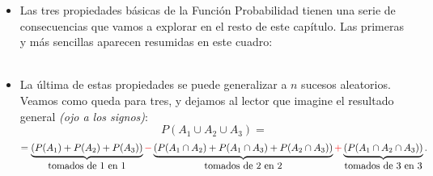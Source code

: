 \begin{itemize}

    \item Las tres propiedades básicas de la Función Probabilidad tienen una serie de consecuencias que vamos a explorar en el resto de este capítulo. Las primeras y más sencillas aparecen resumidas en este cuadro:\\[3mm]
                \\[3mm]
    \item La última de estas propiedades se puede generalizar a $n$ sucesos aleatorios. Veamos como queda para tres, y dejamos al lector que imagine el resultado general {\em (ojo a los signos)}:
    \[P(A_1\cup A_2\cup A_3)=\]\[=\underbrace{\left(P(A_1)+P(A_2)+P(A_3)\right)}_{\mbox{tomados de 1 en 1}}\textcolor{red}{\mathbf -}
    \underbrace{\left(P(A_1\cap A_2)+P(A_1\cap A_3)+P(A_2\cap A_3)\right)}_{\mbox{tomados de 2 en 2}}\textcolor{red}{\mathbf +}\underbrace{\left(P(A_1\cap A_2\cap A_3)\right)}_{\mbox{tomados de 3 en 3}}.
    \]



\end{itemize}

